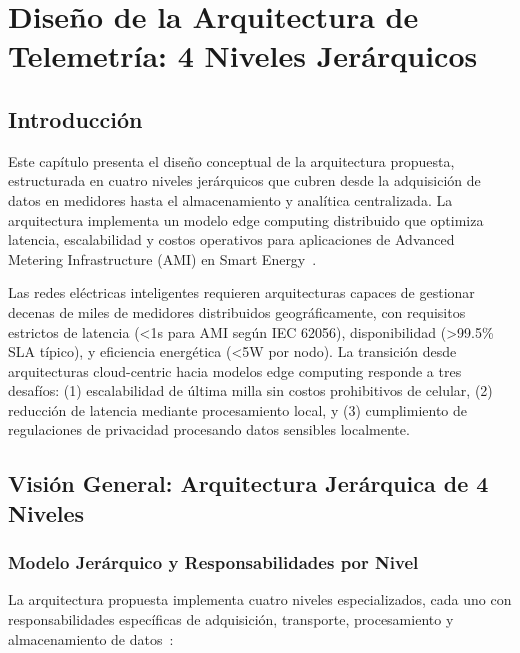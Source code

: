 ﻿\chapter{Diseño de la Arquitectura de Telemetría: 4 Niveles Jerárquicos}
\label{chap:arquitectura}

\section{Introducción}

Este capítulo presenta el diseño conceptual de la arquitectura propuesta, estructurada en cuatro niveles jerárquicos que cubren desde la adquisición de datos en medidores hasta el almacenamiento y analítica centralizada. La arquitectura implementa un modelo edge computing distribuido que optimiza latencia, escalabilidad y costos operativos para aplicaciones de Advanced Metering Infrastructure (AMI) en Smart Energy~\cite{alsafranChallengesImplementingIoT2025,velasquezSmartGridsEmpowered2024}.

Las redes eléctricas inteligentes requieren arquitecturas capaces de gestionar decenas de miles de medidores distribuidos geográficamente, con requisitos estrictos de latencia (<1s para AMI según IEC 62056), disponibilidad (>99.5\% SLA típico), y eficiencia energética (<5W por nodo). La transición desde arquitecturas cloud-centric hacia modelos edge computing responde a tres desafíos: (1) escalabilidad de última milla sin costos prohibitivos de celular, (2) reducción de latencia mediante procesamiento local, y (3) cumplimiento de regulaciones de privacidad procesando datos sensibles localmente.

\section{Visión General: Arquitectura Jerárquica de 4 Niveles}

\subsection{Modelo Jerárquico y Responsabilidades por Nivel}

La arquitectura propuesta implementa cuatro niveles especializados, cada uno con responsabilidades específicas de adquisición, transporte, procesamiento y almacenamiento de datos~\cite{choudharyInternetThingsComprehensive2024,tangResearchInteroperabilityIoT}:

